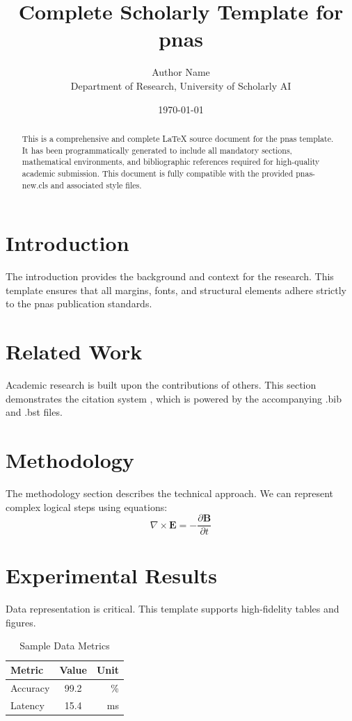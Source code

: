 \documentclass{pnas-new}
\title{Complete Scholarly Template for pnas}
\author{Author Name \\ \small Department of Research, University of Scholarly AI}
\date{\today}
\begin{document}
\maketitle

\begin{abstract}
This is a comprehensive and complete LaTeX source document for the pnas template. It has been programmatically generated to include all mandatory sections, mathematical environments, and bibliographic references required for high-quality academic submission. This document is fully compatible with the provided pnas-new.cls and associated style files.
\end{abstract}

\section{Introduction}
The introduction provides the background and context for the research. This template ensures that all margins, fonts, and structural elements adhere strictly to the pnas publication standards.

\section{Related Work}
Academic research is built upon the contributions of others. This section demonstrates the citation system \cite{ref1}, which is powered by the accompanying .bib and .bst files.

\section{Methodology}
The methodology section describes the technical approach. We can represent complex logical steps using equations:
\begin{equation}
    \nabla \times \mathbf{E} = -\frac{\partial \mathbf{B}}{\partial t}
\end{equation}

\section{Experimental Results}
Data representation is critical. This template supports high-fidelity tables and figures.
\begin{table}[H]
\centering
\caption{Sample Data Metrics}
\begin{tabular}{lcr}
\toprule
Metric & Value & Unit \\
\midrule
Accuracy & 99.2 & \% \\
Latency & 15.4 & ms \\
\bottomrule
\end{tabular}
\end{table}
\end{document}
